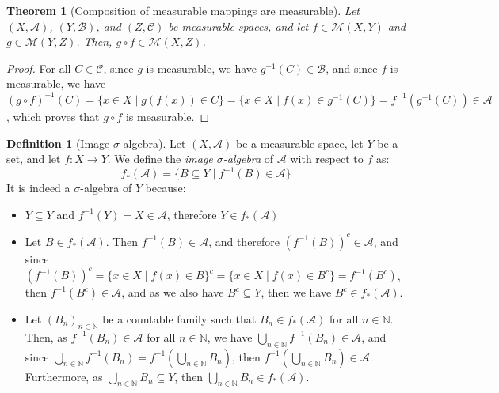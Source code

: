 \documentclass{article}
\newtheorem{theorem}{Theorem}[section]
\theoremstyle{definition}
\newtheorem{definition}{Definition}[section]
\theoremstyle{remark}
\theoremstyle{example}
\theoremstyle{notation}
\theoremstyle{axiom}
\begin{document}
\begin{theorem}[Composition of measurable mappings are measurable] \label{thm:compose-measurable}
		Let $(X, \mathcal{A})$, $(Y, \mathcal{B})$, and $(Z, \mathcal{C})$ be measurable spaces, and let $f \in \mathcal{M}(X, Y)$ and $g \in \mathcal{M}(Y, Z)$. Then, $g \circ f \in \mathcal{M}(X, Z)$.
\end{theorem}

\begin{proof}
		For all $C \in \mathcal{C}$, since $g$ is measurable, we have $g^{-1}(C) \in \mathcal{B}$, and since $f$ is measurable, we have $(g \circ f)^{-1}(C) = \{x \in X \mid g(f(x)) \in C\} = \{x \in X \mid f(x) \in g^{-1}(C)\} = f^{-1}(g^{-1}(C)) \in \mathcal{A}$, which proves that $g \circ f$ is measurable.
\end{proof}

\begin{definition}[Image $\sigma$-algebra] %
		Let $(X, \mathcal{A})$ be a measurable space, let $Y$ be a set, and let $f : X \rightarrow Y$. We define the \textit{image $\sigma$-algebra} of $\mathcal{A}$ with respect to $f$ as:
				$$f_*(\mathcal{A}) = \{B \subseteq Y \mid f^{-1}(B) \in \mathcal{A}\}$$
		It is indeed a $\sigma$-algebra of $Y$ because:
		\begin{itemize}
				\item $Y \subseteq Y$ and $f^{-1}(Y) = X \in \mathcal{A}$, therefore $Y \in f_*(\mathcal{A})$
				\item Let $B \in f_*(\mathcal{A})$. Then $f^{-1}(B) \in \mathcal{A}$, and therefore $(f^{-1}(B))^c \in \mathcal{A}$, and since $(f^{-1}(B))^c = \{x \in X \mid f(x) \in B\}^c = \{x \in X \mid f(x) \in B^c\} = f^{-1}(B^c)$, then $f^{-1}(B^c) \in \mathcal{A}$, and as we also have $B^c \subseteq Y$, then we have $B^c \in f_*(\mathcal{A})$.
				\item Let $(B_n)_{n \in \mathbb{N}}$ be a countable family such that $B_n \in f_*(\mathcal{A})$ for all $n \in \mathbb{N}$. Then, as $f^{-1}(B_n) \in \mathcal{A}$ for all $n \in \mathbb{N}$, we have $\bigcup_{n \in \mathbb{N}} f^{-1}(B_n) \in \mathcal{A}$, and since $\bigcup_{n \in \mathbb{N}} f^{-1}(B_n) = f^{-1}(\bigcup_{n \in \mathbb{N}} B_n)$, then $f^{-1}(\bigcup_{n \in \mathbb{N}} B_n) \in \mathcal{A}$. Furthermore, as $\bigcup_{n \in \mathbb{N}} B_n \subseteq Y$, then $\bigcup_{n \in \mathbb{N}} B_n \in f_*(\mathcal{A})$.
		\end{itemize}
\end{definition}
\end{document}
